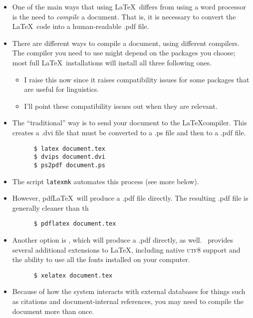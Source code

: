 \documentclass[11pt, letterpaper]{article}
\begin{document}
    \begin{itemize}
    
	\item One of the main ways that using \LaTeX\ differs from using a word processor is the need to \emph{compile} a document. That is, it is necessary to convert the \LaTeX\ code into a human-readable .pdf file.
    
      \item There are different ways to compile a document, using different compilers. The compiler you need to use might depend on the packages you choose; most full \LaTeX\ installations will install all three following ones.
      
	  \begin{itemize}
	  
	    \item I raise this now since it raises compatibility issues for some packages that are useful for linguistics. 
	    
	    \item I'll point these compatibility issues out when they are relevant.
	  
	  \end{itemize}
      
      \item The “traditional” way is to send your document to the \LaTeX compiler. This creates a .dvi file that must be converted to a .ps file and then to a .pdf file.
      
	\begin{verbatim}
	  $ latex document.tex
	  $ dvips document.dvi
	  $ ps2pdf document.ps
	\end{verbatim}
	
	\item The script \verb|latexmk| automates this process (see more below).
	

      \item However, pdf\LaTeX\ will produce a .pdf file directly. The resulting .pdf file is generally cleaner than th
      
	\begin{verbatim}
	  $ pdflatex document.tex
	\end{verbatim}
	
      \item Another option is \XeLaTeX, which will produce a .pdf directly, as well. \XeLaTeX\ provides several additional extensions to \LaTeX, including native \textsc{utf8} support and the ability to use all the fonts installed on your computer.
      
	\begin{verbatim}
	  $ xelatex document.tex
	\end{verbatim}
	

      \item Because of how the system interacts with external databases for things such as citations and document-internal references, you may need to compile the document more than once.
      
%       
    \end{itemize}
    
\end{document}
